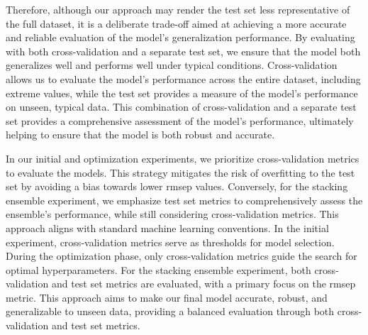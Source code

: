 Therefore, although our approach may render the test set less representative of the full dataset, it is a deliberate trade-off aimed at achieving a more accurate and reliable evaluation of the model's generalization performance.
By evaluating with both cross-validation and a separate test set, we ensure that the model both generalizes well and performs well under typical conditions.
Cross-validation allows us to evaluate the model's performance across the entire dataset, including extreme values, while the test set provides a measure of the model's performance on unseen, typical data.
This combination of cross-validation and a separate test set provides a comprehensive assessment of the model's performance, ultimately helping to ensure that the model is both robust and accurate.

In our initial and optimization experiments, we prioritize cross-validation metrics to evaluate the models.
This strategy mitigates the risk of overfitting to the test set by avoiding a bias towards lower \gls{rmsep} values.
Conversely, for the stacking ensemble experiment, we emphasize test set metrics to comprehensively assess the ensemble's performance, while still considering cross-validation metrics.
This approach aligns with standard machine learning conventions\cite{geronHandsonMachineLearning2023}.
In the initial experiment, cross-validation metrics serve as thresholds for model selection.
During the optimization phase, only cross-validation metrics guide the search for optimal hyperparameters.
For the stacking ensemble experiment, both cross-validation and test set metrics are evaluated, with a primary focus on the \gls{rmsep} metric.
This approach aims to make our final model accurate, robust, and generalizable to unseen data, providing a balanced evaluation through both cross-validation and test set metrics.
